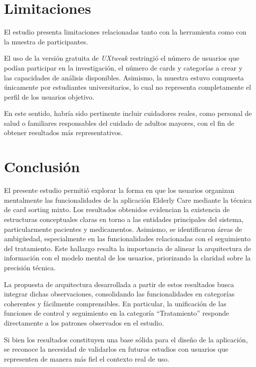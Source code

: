 \documentclass[11pt]{article}
\begin{document}
\section{Limitaciones}

El estudio presenta limitaciones relacionadas tanto con la herramienta como con la muestra de
participantes.

El uso de la versión gratuita de \textit{UXtweak} restringió el número de usuarios que podían participar en la investigación, el número de cards y categorías a crear y las capacidades de análisis disponibles. Asimismo, la muestra estuvo compuesta únicamente por estudiantes universitarios, lo cual no representa completamente el perfil de los usuarios objetivo.

En este sentido, habría sido pertinente incluir cuidadores reales, como personal de salud o familiares responsables del cuidado de adultos mayores, con el fin de obtener resultados más representativos.

\section{Conclusión}

El presente estudio permitió explorar la forma en que los usuarios organizan mentalmente las funcionalidades de la aplicación Elderly Care mediante la técnica de card sorting mixto. Los resultados obtenidos evidencian la existencia de estructuras conceptuales claras en torno a las entidades principales del sistema, particularmente pacientes y medicamentos.
\newpage
Asimismo, se identificaron áreas de ambigüedad, especialmente en las funcionalidades relacionadas con el seguimiento del tratamiento. Este hallazgo resalta la importancia de alinear la arquitectura de información con el modelo mental de los usuarios, priorizando la claridad sobre la precisión técnica.

La propuesta de arquitectura desarrollada a partir de estos resultados busca integrar dichas observaciones, consolidando las funcionalidades en categorías coherentes y fácilmente comprensibles. En particular, la unificación de las funciones de control y seguimiento en la categoría ``Tratamiento'' responde directamente a los patrones observados en el estudio.

Si bien los resultados constituyen una base sólida para el diseño de la aplicación, se reconoce la necesidad de validarlos en futuros estudios con usuarios que representen de manera más fiel el contexto real de uso.

\end{document}
